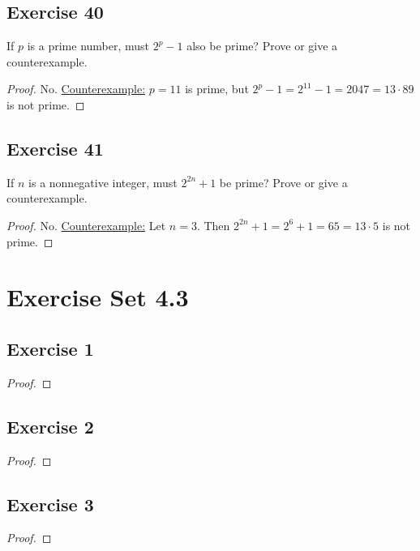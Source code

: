 \documentclass[14pt]{extarticle}
\begin{document}
\subsection{Exercise 40}
If $p$ is a prime number, must $2^p - 1$ also be prime? Prove or give a counterexample.

\begin{proof}
No. \underline{Counterexample:} $p = 11$ is prime, but $2^p - 1 = 2^{11} - 1 = 2047 = 13 \cdot 89$ is not prime.
\end{proof}

\subsection{Exercise 41}
If $n$ is a nonnegative integer, must $2^{2n} + 1$ be prime? Prove or give a counterexample.

\begin{proof}
No. \underline{Counterexample:} Let $n = 3$. Then $2^{2n} + 1 = 2^{6} + 1 = 65 = 13 \cdot 5$ is not prime.
\end{proof}

\section{Exercise Set 4.3}

\subsection{Exercise 1}

\begin{proof}

\end{proof}

\subsection{Exercise 2}

\begin{proof}

\end{proof}

\subsection{Exercise 3}

\begin{proof}

\end{proof}
\end{document}
